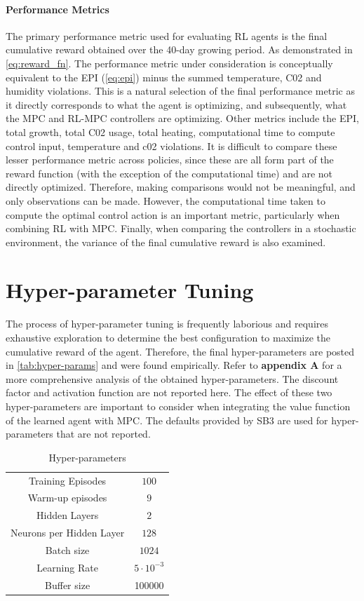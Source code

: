 \paragraph{Performance Metrics}
The primary performance metric used for evaluating RL agents is the final cumulative reward obtained over the 40-day growing period. As demonstrated in \autoref{eq:reward_fn}. The performance metric under consideration is conceptually equivalent to the EPI (\autoref{eq:epi}) minus the summed temperature, C02 and humidity violations. This is a natural selection of the final performance metric as it directly corresponds to what the agent is optimizing, and subsequently, what the MPC and RL-MPC controllers are optimizing. Other metrics include the EPI, total growth, total C02 usage, total heating, computational time to compute control input, temperature and c02 violations. It is difficult to compare these lesser performance metric across policies, since these are all form part of the reward function (with the exception of the computational time) and are not directly optimized. Therefore, making comparisons would not be meaningful, and only observations can be made. However, the computational time taken to compute the optimal control action is an important metric, particularly when combining RL with MPC. Finally, when comparing the controllers in a stochastic environment, the variance of the final cumulative reward is also examined.

\section{Hyper-parameter Tuning}
The process of hyper-parameter tuning is frequently laborious and requires exhaustive exploration to determine the best configuration to maximize the cumulative reward of the agent. Therefore, the final hyper-parameters are posted in \autoref{tab:hyper-params} and were found empirically. Refer to \textbf{appendix A} for a more comprehensive analysis of the obtained hyper-parameters. The discount factor and activation function are not reported here. The effect of these two hyper-parameters are important to consider when integrating the value function of the learned agent with MPC. The defaults provided by SB3 are used for hyper-parameters that are not reported.

\begin{table}[h]
    \centering
    \begin{tabular}{|c|c|}
    \hline
        Training Episodes & $100$  \\
        Warm-up episodes &  $9$\\
        Hidden Layers & $2$ \\
        Neurons per Hidden Layer& $128$ \\
        Batch size & $1024$ \\
        Learning Rate & $5\cdot 10^{-3}$ \\
        Buffer size & 100000 \\
        \hline
        
    \end{tabular}
    \caption{Hyper-parameters}
    \label{tab:hyper-params}
\end{table}

